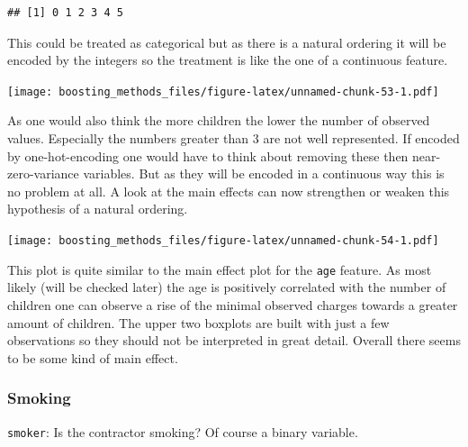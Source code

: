 \documentclass[
]{book}
\newenvironment{Shaded}{\begin{snugshade}}{\end{snugshade}}
\newcommand{\CommentTok}[1]{\textcolor[rgb]{0.56,0.35,0.01}{\textit{#1}}}
\newcommand{\FunctionTok}[1]{\textcolor[rgb]{0.00,0.00,0.00}{#1}}
\newcommand{\NormalTok}[1]{#1}
\newcommand{\SpecialCharTok}[1]{\textcolor[rgb]{0.00,0.00,0.00}{#1}}
\begin{document}
\begin{Shaded}
\end{Shaded}

\begin{verbatim}
## [1] 0 1 2 3 4 5
\end{verbatim}

This could be treated as categorical but as there is a natural ordering it will be encoded by the integers so the treatment is like the one of a continuous feature.

\texttt{[image: boosting\_methods\_files/figure-latex/unnamed-chunk-53-1.pdf]}

As one would also think the more children the lower the number of observed values. Especially the numbers greater than 3 are not well represented. If encoded by one-hot-encoding one would have to think about removing these then near-zero-variance variables. But as they will be encoded in a continuous way this is no problem at all. A look at the main effects can now strengthen or weaken this hypothesis of a natural ordering.

\texttt{[image: boosting\_methods\_files/figure-latex/unnamed-chunk-54-1.pdf]}

This plot is quite similar to the main effect plot for the \texttt{age} feature. As most likely (will be checked later) the age is positively correlated with the number of children one can observe a rise of the minimal observed charges towards a greater amount of children. The upper two boxplots are built with just a few observations so they should not be interpreted in great detail. Overall there seems to be some kind of main effect.

\hypertarget{smoking}{%
\subsubsection{Smoking}\label{smoking}}

\texttt{smoker}: Is the contractor smoking? Of course a binary variable.

\begin{Shaded}
\end{Shaded}
\end{document}
